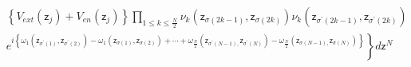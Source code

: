 \documentclass[aps,preprint]{revtex4}%
\begin{document}
\begin{description}
\begin{align}
&  \left\{  V_{ext}\left(  \mathsf{z}_{j}\right)  +V_{en}\left(
\mathsf{z}_{j}\right)  \right\}
{\displaystyle\prod\limits_{1\leq k\leq\frac{N}{2}}}
\nu_{k}\left(  \mathsf{z}_{\sigma\left(  2k-1\right)  },\mathsf{z}%
_{\sigma\left(  2k\right)  }\right)  \nu_{k}\left(  \mathsf{z}_{\sigma
^{\prime}\left(  2k-1\right)  },\mathsf{z}_{\sigma^{\prime}\left(  2k\right)
}\right) \nonumber\\
&  \left.  e^{i\left\{  \omega_{1}\left(  \mathsf{z}_{\sigma^{\prime}\left(
1\right)  },\mathsf{z}_{\sigma^{\prime}\left(  2\right)  }\right)  -\omega
_{1}\left(  \mathsf{z}_{\sigma\left(  1\right)  },\mathsf{z}_{\sigma\left(
2\right)  }\right)  +\cdots+\omega_{\frac{N}{2}}\left(  \mathsf{z}%
_{\sigma^{\prime}\left(  N-1\right)  ,}\mathsf{z}_{\sigma^{\prime}\left(
N\right)  }\right)  -\omega_{\frac{N}{2}}\left(  \mathsf{z}_{\sigma\left(
N-1\right)  ,}\mathsf{z}_{\sigma\left(  N\right)  }\right)  \right\}
}\right\}  d\mathsf{z}^{N}%
\end{align}

\end{description}
\end{document}
